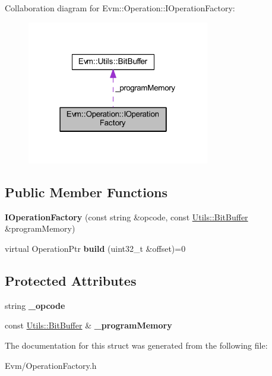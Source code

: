 Collaboration diagram for Evm\+:\+:Operation\+:\+:I\+Operation\+Factory\+:
\nopagebreak
\begin{figure}[H]
\begin{center}
\leavevmode
\includegraphics[width=226pt]{struct_evm_1_1_operation_1_1_i_operation_factory__coll__graph}
\end{center}
\end{figure}
\subsection*{Public Member Functions}
\begin{DoxyCompactItemize}
\item 
\mbox{\label{struct_evm_1_1_operation_1_1_i_operation_factory_a7621b51ca2bc125b36be673486e33781}} 
{\bfseries I\+Operation\+Factory} (const string \&opcode, const \mbox{\hyperlink{struct_evm_1_1_utils_1_1_bit_buffer}{Utils\+::\+Bit\+Buffer}} \&program\+Memory)
\item 
\mbox{\label{struct_evm_1_1_operation_1_1_i_operation_factory_a081d943adde12a09211a1e887029b471}} 
virtual Operation\+Ptr {\bfseries build} (uint32\+\_\+t \&offset)=0
\end{DoxyCompactItemize}
\subsection*{Protected Attributes}
\begin{DoxyCompactItemize}
\item 
\mbox{\label{struct_evm_1_1_operation_1_1_i_operation_factory_a70bc63732326d70ca275a37f84c52e12}} 
string {\bfseries \+\_\+opcode}
\item 
\mbox{\label{struct_evm_1_1_operation_1_1_i_operation_factory_af921c76923ba9cc2483fb71ebab0fec1}} 
const \mbox{\hyperlink{struct_evm_1_1_utils_1_1_bit_buffer}{Utils\+::\+Bit\+Buffer}} \& {\bfseries \+\_\+program\+Memory}
\end{DoxyCompactItemize}


The documentation for this struct was generated from the following file\+:\begin{DoxyCompactItemize}
\item 
Evm/Operation\+Factory.\+h\end{DoxyCompactItemize}
